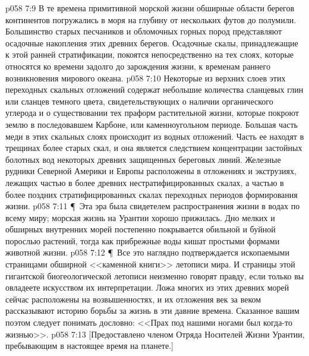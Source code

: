 \vs p058 7:9 В те времена примитивной морской жизни обширные области берегов континентов погружались в моря на глубину от нескольких футов до полумили. Большинство старых песчаников и обломочных горных пород представляют осадочные накопления этих древних берегов. Осадочные скалы, принадлежащие к этой ранней стратификации, покоятся непосредственно на тех слоях, которые относятся ко времени задолго до зарождения жизни, к временам раннего возникновения мирового океана.
\vs p058 7:10 Некоторые из верхних слоев этих переходных скальных отложений содержат небольшие количества сланцевых глин или сланцев темного цвета, свидетельствующих о наличии органического углерода и о существовании тех праформ растительной жизни, которые покроют землю в последовавшем Карбоне, или каменноугольном периоде. Большая часть меди в этих скальных слоях происходит из водных отложений. Часть ее находят в трещинах более старых скал, и она является следствием концентрации застойных болотных вод некоторых древних защищенных береговых линий. Железные рудники Северной Америки и Европы расположены в отложениях и экструзиях, лежащих частью в более древних нестратифицированных скалах, а частью в более поздних стратифицированных скалах переходных периодов формирования жизни.
\vs p058 7:11 \P\ Эта эра была свидетелем распространения жизни в водах по всему миру; морская жизнь на Урантии хорошо прижилась. Дно мелких и обширных внутренних морей постепенно покрывается обильной и буйной порослью растений, тогда как прибрежные воды кишат простыми формами животной жизни.
\vs p058 7:12 \P\ Все это наглядно подтверждается ископаемыми страницами обширной <<каменной книги>> летописи мира. И страницы этой гигантской биогеологической летописи неизменно говорят правду, если только вы овладеете искусством их интерпретации. Ложа многих из этих древних морей сейчас расположены на возвышенностях, и их отложения век за веком рассказывают историю борьбы за жизнь в эти давние времена. Сказанное вашим поэтом следует понимать дословно: <<Прах под нашими ногами был когда\hyp{}то жизнью>>.
\vs p058 7:13 [Предоставлено членом Отряда Носителей Жизни Урантии, пребывающим в настоящее время на планете.]
